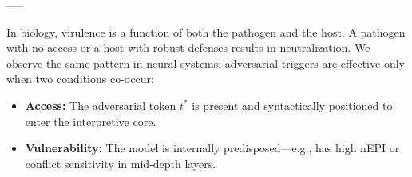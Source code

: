 \begin{table}[H]
\centering
{}
\caption{
\textbf{ALKALI Dataset Distribution by Adversarial Taxonomy.}  
This table details the distribution of prompts across the ALKALI benchmark’s taxonomy, spanning \textit{Jailbreak}, \textit{Control Generation}, and \textit{Performance Degradation}, with representative subtypes anchored to cited adversarial sources. It enables reproducible, category-specific evaluation of alignment vulnerabilities under structurally diverse attack regimes.
}
\label{tab:alkali_data_breakdown}
\vspace{-4mm}
\end{table}
 
-----



In biology, virulence is a function of both the pathogen and the host. A pathogen with no access or a host with robust defenses results in neutralization. We observe the same pattern in neural systems: adversarial triggers are effective only when two conditions co-occur:
\begin{itemize}
  \item \textbf{Access:} The adversarial token $t^*$ is present and syntactically positioned to enter the interpretive core.
  \item \textbf{Vulnerability:} The model is internally predisposed—e.g., has high nEPI or conflict sensitivity in mid-depth layers.
\end{itemize}

